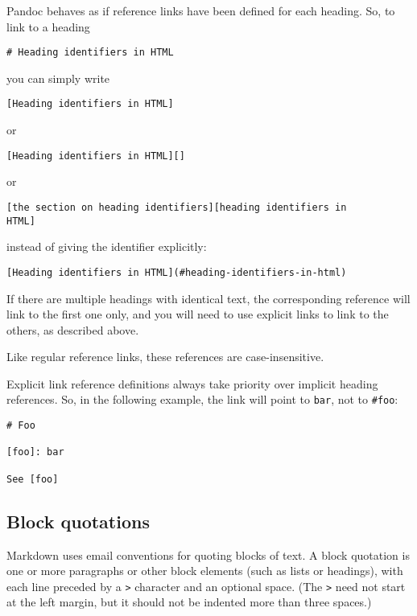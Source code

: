 Pandoc behaves as if reference links have been defined for each heading.
So, to link to a heading

\begin{verbatim}
# Heading identifiers in HTML
\end{verbatim}

you can simply write

\begin{verbatim}
[Heading identifiers in HTML]
\end{verbatim}

or

\begin{verbatim}
[Heading identifiers in HTML][]
\end{verbatim}

or

\begin{verbatim}
[the section on heading identifiers][heading identifiers in
HTML]
\end{verbatim}

instead of giving the identifier explicitly:

\begin{verbatim}
[Heading identifiers in HTML](#heading-identifiers-in-html)
\end{verbatim}

If there are multiple headings with identical text, the corresponding
reference will link to the first one only, and you will need to use
explicit links to link to the others, as described above.

Like regular reference links, these references are case-insensitive.

Explicit link reference definitions always take priority over implicit
heading references. So, in the following example, the link will point to
\texttt{bar}, not to \texttt{\#foo}:

\begin{verbatim}
# Foo

[foo]: bar

See [foo]
\end{verbatim}

\hypertarget{block-quotations}{%
\subsection{Block quotations}\label{block-quotations}}

Markdown uses email conventions for quoting blocks of text. A block
quotation is one or more paragraphs or other block elements (such as
lists or headings), with each line preceded by a \texttt{\textgreater{}}
character and an optional space. (The \texttt{\textgreater{}} need not
start at the left margin, but it should not be indented more than three
spaces.)

